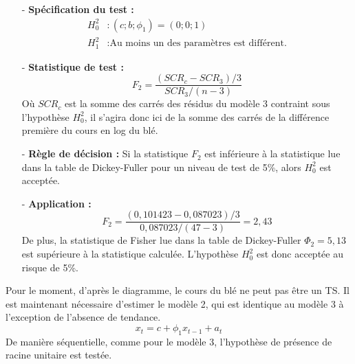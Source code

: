 \begin{itemize}
\item[-]\textbf{Spécification du test :} 
\begin{equation*}
    \begin{split}
        H_{0}^{2} &: (c; b; \phi_{1}) = (0;0;1)\\
        H_{1}^{2} &: \text{Au moins un des paramètres est différent.}
    \end{split}
\end{equation*}
\item[-]\textbf{Statistique de test :}
\begin{equation*}
    F_{2} = \frac{(SCR_{c} - SCR_{3})/3}{SCR_{3}/(n-3)}
\end{equation*}
Où $SCR_{c}$ est la somme des carrés des résidus du modèle 3 contraint sous l'hypothèse $H_{0}^{2}$, il s'agira donc ici de la somme des carrés de la différence première
du cours en log du blé.
\item[-]\textbf{Règle de décision :}  Si la statistique $F_{2}$ est inférieure à la statistique lue dans la table de Dickey-Fuller pour un niveau de test de 5\%, alors $H_{0}^{2}$ est acceptée.
\item[-]\textbf{Application :} 
\begin{equation*}
    F_{2} = \frac{(0,101423 - 0,087023)/3}{0,087023/(47-3)} = 2,43
\end{equation*}
De plus, la statistique de Fisher lue dans la table de Dickey-Fuller $\Phi_{2} = 5,13$ est supérieure à la statistique calculée. L'hypothèse $H_{0}^{2}$ est donc acceptée
au risque de 5\%. 
\end{itemize}
%
Pour le moment, d'après le diagramme, le cours du blé ne peut pas être un TS. Il est maintenant nécessaire d'estimer le modèle 2, qui est identique au modèle 3 à 
l'exception de l'absence de tendance.
\begin{equation*}
    x_{t} = c + \phi_{1} x_{t-1} + a_{t}
\end{equation*}
De manière séquentielle, comme pour le modèle 3, l'hypothèse de présence de racine unitaire est testée.
%
